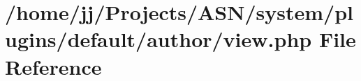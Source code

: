 \hypertarget{system_2plugins_2default_2author_2view_8php}{}\section{/home/jj/\+Projects/\+A\+S\+N/system/plugins/default/author/view.php File Reference}
\label{system_2plugins_2default_2author_2view_8php}
